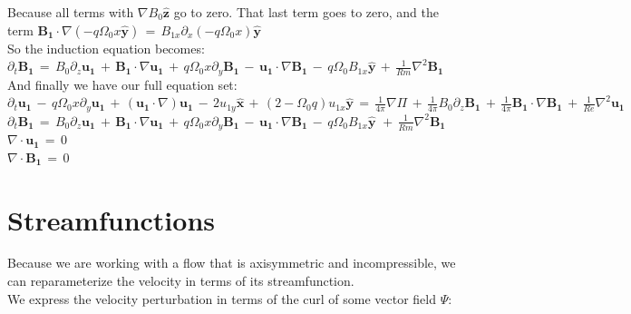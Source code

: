 \documentclass[letterpaper,12pt]{article}
\newcommand\reye{\mathrel{Re}}
\newcommand\reym{\mathrel{Rm}}
\begin{document}
Because all terms with $\nabla B_0 \mathbf{\hat{z}}$ go to zero. That last term goes to zero, and the term $\mathbf{B_1}\cdot \nabla\left(-q\Omega_0x \mathbf{\hat{y}}\right) \, = \, B_{1x} \partial_x\left(-q \Omega_0 x \right) \mathbf{\hat{y}}$ \\

So the induction equation becomes: \\

$\partial_t \mathbf{B_1} \, = \, B_0 \partial_z \mathbf{u_1} \, + \, \mathbf{B_1} \cdot \nabla \mathbf{u_1} \, + \, q \Omega_0 x \partial_y \mathbf{B_1} \, - \, \mathbf{u_1} \cdot \nabla \mathbf{B_1} \, - \, q\Omega_0 B_{1x} \mathbf{\hat{y}} \,+ \, \frac{1}{\reym} \nabla^2 \mathbf{B_1} $ \\

And finally we have our full equation set: \\

$\partial_t \mathbf{u_1} \, - \, q\Omega_0 x \partial_y \mathbf{u_1} \, + \, \left(\mathbf{u_1}\cdot \nabla\right) \mathbf{u_1} \, - \, 2 u_{1y} \mathbf{\hat{x}} \, + \, \left(2 - \Omega_0 q\right)u_{1x}\mathbf{\hat{y}} \, = \, \frac{1}{4\pi} \nabla \Pi \, + \, \frac{1}{4\pi}B_0\partial_z\mathbf{B_1} \, + \, \frac{1}{4\pi}\mathbf{B_1} \cdot \nabla \mathbf{B_1}\,  + \, \frac{1}{\reye}\nabla^2 \mathbf{u_1}$ \\

$\partial_t \mathbf{B_1} \, = \, B_0 \partial_z \mathbf{u_1} \, + \, \mathbf{B_1} \cdot \nabla \mathbf{u_1} \, + \, q \Omega_0 x \partial_y \mathbf{B_1} \, - \, \mathbf{u_1} \cdot \nabla \mathbf{B_1} \, - \, q\Omega_0 B_{1x} \mathbf{\hat{y}} \,\, + \, \frac{1}{\reym} \nabla^2 \mathbf{B_1} $ \\

$\nabla \cdot \mathbf{u_1} \, = \, 0$\\

$\nabla \cdot \mathbf{B_1} \, = \, 0$ \\ 

\section*{Streamfunctions}

Because we are working with a flow that is axisymmetric and incompressible, we can reparameterize the velocity in terms of its streamfunction. \\

We express the velocity perturbation in terms of the curl of some vector field $\Psi$: \\
 
\end{document}
